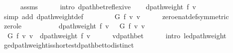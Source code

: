 \begin{isabellebody}
\ \ \ \ \isamarkupfalse%
\ assms\isanewline
\ \ \ \ \isamarkupfalse%
\ {\isacharparenleft}{\kern0pt}intro\ dpath{\isacharunderscore}{\kern0pt}bet{\isacharunderscore}{\kern0pt}reflexive{\isacharparenright}{\kern0pt}\isanewline
\ \ \isamarkupfalse%
\ {\isachardoublequoteopen}dpath{\isacharunderscore}{\kern0pt}weight\ f\ {\isacharbrackleft}{\kern0pt}v{\isacharbrackright}{\kern0pt}\ {\isacharequal}{\kern0pt}\ {}{\isachardoublequoteclose}\isanewline
\ \ \ \ \isamarkupfalse%
\ {\isacharparenleft}{\kern0pt}simp\ add{\isacharcolon}{\kern0pt}\ dpath{\isacharunderscore}{\kern0pt}weight{\isacharunderscore}{\kern0pt}def{\isacharparenright}{\kern0pt}\isanewline
\ \ \isamarkupfalse%
\ \isamarkupfalse%
\ {\isachardoublequoteopen}{\isachardot}{\kern0pt}{\isachardot}{\kern0pt}{\isachardot}{\kern0pt}\ {\isasymle}\ {\isasymdelta}\ G\ f\ v\ v{\isachardoublequoteclose}\isanewline
\ \ \ \ \isamarkupfalse%
\ zero{\isacharunderscore}{\kern0pt}enat{\isacharunderscore}{\kern0pt}def{\isacharbrackleft}{\kern0pt}symmetric{\isacharbrackright}{\kern0pt}\isanewline
\ \ \ \ \isamarkupfalse%
\ zero{\isacharunderscore}{\kern0pt}le\isanewline
\ \ \ \ \isacommand{{\isachardot}{\kern0pt}}\isamarkupfalse%
\isanewline
\ \ \isamarkupfalse%
\ \isamarkupfalse%
\ {\isachardoublequoteopen}dpath{\isacharunderscore}{\kern0pt}weight\ f\ {\isacharbrackleft}{\kern0pt}v{\isacharbrackright}{\kern0pt}\ {\isasymle}\ {\isasymdelta}\ G\ f\ v\ v{\isachardoublequoteclose}\isanewline
\ \ \ \ \isacommand{{\isachardot}{\kern0pt}}\isamarkupfalse%
\isanewline
\ \ \isamarkupfalse%
\ {\isachardoublequoteopen}{\isasymdelta}\ G\ f\ v\ v\ {\isasymle}\ dpath{\isacharunderscore}{\kern0pt}weight\ f\ {\isacharbrackleft}{\kern0pt}v{\isacharbrackright}{\kern0pt}{\isachardoublequoteclose}\isanewline
\ \ \ \ \isamarkupfalse%
\ v{\isacharunderscore}{\kern0pt}dpath{\isacharunderscore}{\kern0pt}bet\isanewline
\ \ \ \ \isamarkupfalse%
\ {\isacharparenleft}{\kern0pt}intro\ {\isasymdelta}{\isacharunderscore}{\kern0pt}le{\isacharunderscore}{\kern0pt}dpath{\isacharunderscore}{\kern0pt}weight{\isacharparenright}{\kern0pt}\isanewline
{}\isamarkupfalse%
%
\endisatagproof
{\isafoldproof}%
%
\isadelimproof
\isanewline
%
\endisadelimproof
%
\isadeliminvisible
\isanewline
%
\endisadeliminvisible
%
\isataginvisible
{}\isamarkupfalse%
\ {\isasymdelta}{\isacharunderscore}{\kern0pt}ge{\isacharunderscore}{\kern0pt}dpath{\isacharunderscore}{\kern0pt}weight{\isacharunderscore}{\kern0pt}is{\isacharunderscore}{\kern0pt}shortest{\isacharunderscore}{\kern0pt}dpath{\isacharunderscore}{\kern0pt}bet{\isacharunderscore}{\kern0pt}to{\isacharunderscore}{\kern0pt}distinct{\isacharcolon}{\kern0pt}\isanewline

\end{isabellebody}
